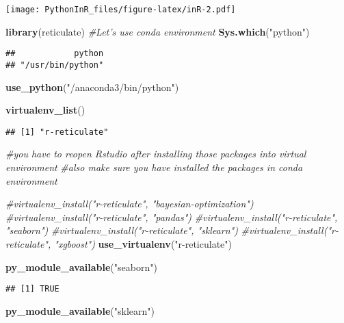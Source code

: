 \documentclass[]{article}
\newenvironment{Shaded}{\begin{snugshade}}{\end{snugshade}}
\newcommand{\CommentTok}[1]{\textcolor[rgb]{0.56,0.35,0.01}{\textit{#1}}}
\newcommand{\KeywordTok}[1]{\textcolor[rgb]{0.13,0.29,0.53}{\textbf{#1}}}
\newcommand{\NormalTok}[1]{#1}
\newcommand{\StringTok}[1]{\textcolor[rgb]{0.31,0.60,0.02}{#1}}
\begin{document}
\texttt{[image: PythonInR\_files/figure-latex/inR-2.pdf]}

\begin{Shaded}
\begin{Highlighting}[]
\KeywordTok{library}\NormalTok{(reticulate)}
\CommentTok{#Let's use conda environment}
\KeywordTok{Sys.which}\NormalTok{(}\StringTok{"python"}\NormalTok{)}
\end{Highlighting}
\end{Shaded}

\begin{verbatim}
##            python 
## "/usr/bin/python"
\end{verbatim}

\begin{Shaded}
\begin{Highlighting}[]
\KeywordTok{use_python}\NormalTok{(}\StringTok{"/anaconda3/bin/python"}\NormalTok{)}

\KeywordTok{virtualenv_list}\NormalTok{()}
\end{Highlighting}
\end{Shaded}

\begin{verbatim}
## [1] "r-reticulate"
\end{verbatim}

\begin{Shaded}
\begin{Highlighting}[]
\CommentTok{#you have to reopen Rstudio after installing those packages into virtual environment}
\CommentTok{#also make sure you have installed the packages in conda environment}

\CommentTok{#virtualenv_install("r-reticulate", "bayesian-optimization")}
\CommentTok{#virtualenv_install("r-reticulate", "pandas")}
\CommentTok{#virtualenv_install("r-reticulate", "seaborn")}
\CommentTok{#virtualenv_install("r-reticulate", "sklearn")}
\CommentTok{#virtualenv_install("r-reticulate", "xgboost")}
\KeywordTok{use_virtualenv}\NormalTok{(}\StringTok{"r-reticulate"}\NormalTok{)}



\KeywordTok{py_module_available}\NormalTok{(}\StringTok{"seaborn"}\NormalTok{)}
\end{Highlighting}
\end{Shaded}

\begin{verbatim}
## [1] TRUE
\end{verbatim}

\begin{Shaded}
\begin{Highlighting}[]
\KeywordTok{py_module_available}\NormalTok{(}\StringTok{"sklearn"}\NormalTok{)}
\end{Highlighting}
\end{Shaded}
\end{document}

